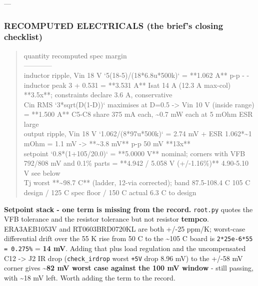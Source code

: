 \documentclass[11pt,a4paper]{article}
\begin{document}
---

\subsubsection*{RECOMPUTED ELECTRICALS (the brief's closing checklist)}
\begin{quote}\small\ttfamily\raggedright
\textbar{} quantity \textbar{} recomputed \textbar{} spec \textbar{} margin \textbar{}\\
\textbar{}---\textbar{}---\textbar{}---\textbar{}---\textbar{}\\
\textbar{} inductor ripple, Vin 18 V \textbar{} `5(18-5)/(18{*}6.8u{*}500k)` = {*}{*}1.062 A{*}{*} p-p \textbar{} - \textbar{} - \textbar{}\\
\textbar{} inductor peak \textbar{} 3 + 0.531 = {*}{*}3.531 A{*}{*} \textbar{} Isat 14 A (12.3 A max-col) \textbar{} {*}{*}3.5x{*}{*}; constraints declare 3.6 A, conservative \textbar{}\\
\textbar{} Cin RMS \textbar{} `3{*}sqrt(D(1-D))` maximises at D=0.5 -\textgreater{} Vin 10 V (inside range) = {*}{*}1.500 A{*}{*} \textbar{} C5-C8 share 375 mA each, \textasciitilde{}0.7 mW each at 5 mOhm ESR \textbar{} large \textbar{}\\
\textbar{} output ripple, Vin 18 V \textbar{} `1.062/(8{*}97u{*}500k)` = 2.74 mV + ESR 1.062{*}\textasciitilde{}1 mOhm = 1.1 mV -\textgreater{} {*}{*}\textasciitilde{}3.8 mV{*}{*} p-p \textbar{} 50 mV \textbar{} {*}{*}13x{*}{*} \textbar{}\\
\textbar{} setpoint \textbar{} `0.8{*}(1+105/20.0)` = {*}{*}5.0000 V{*}{*} nominal; corners with VFB 792/808 mV and 0.1\% parts = {*}{*}4.942 / 5.058 V (+/-1.16\%){*}{*} \textbar{} 4.90-5.10 V \textbar{} see below \textbar{}\\
\textbar{} Tj worst \textbar{} {*}{*}\textasciitilde{}98.7 C{*}{*} (ladder, 12-via corrected); band 87.5-108.4 C \textbar{} 105 C design / 125 C spec floor / 150 C actual \textbar{} 6.3 C to design \textbar{}
\end{quote}
\textbf{Setpoint stack - one term is missing from the record.} \texttt{root.py} quotes the VFB tolerance and the resistor tolerance but not resistor \textbf{tempco}. ERA3AEB1053V and RT0603BRD0720KL are both +/-25 ppm/K; worst-case differential drift over the 55 K rise from 50 C to the \textasciitilde{}105 C board is \texttt{2{*}25e-6{*}55 = 0.275\%} = \textbf{14 mV}. Adding that plus load regulation and the uncompensated C12 -\textgreater{} J2 IR drop (\texttt{check\_irdrop} worst \texttt{+5V} drop 8.96 mV) to the +/-58 mV corner gives \textbf{\textasciitilde{}82 mV worst case against the 100 mV window} - still passing, with \textasciitilde{}18 mV left. Worth adding the term to the record.
\end{document}
